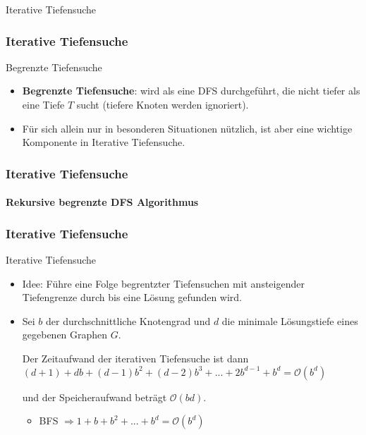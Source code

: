 \begin{frame}
		\Huge Iterative Tiefensuche
\end{frame}
	
\begin{frame}
	\frametitle{Iterative Tiefensuche}
	\begin{KITinfoblock}{Begrenzte Tiefensuche}
	\begin{itemize}
		\item \textbf{Begrenzte Tiefensuche}: wird als eine DFS durchgeführt, die nicht tiefer als eine Tiefe $T$ sucht (tiefere Knoten werden ignoriert).
		\item Für sich allein nur in besonderen Situationen nützlich, ist aber eine wichtige Komponente in Iterative Tiefensuche.
	\end{itemize}
	\end{KITinfoblock}
\end{frame}

\begin{frame}
	\frametitle{Iterative Tiefensuche}
	\framesubtitle{Rekursive begrenzte DFS Algorithmus}
		
\end{frame}

\begin{frame}
	\frametitle{Iterative Tiefensuche}
	\begin{KITinfoblock}{Iterative Tiefensuche}
		\begin{itemize}
			\item Idee: Führe eine Folge begrentzter Tiefensuchen mit ansteigender Tiefengrenze durch bis eine Lösung gefunden wird.
			
			\item Sei $b$ der durchschnittliche Knotengrad und $d$ die minimale Lösungstiefe eines gegebenen Graphen $G$.
			  
			\vspace{0.05in}
			Der Zeitaufwand der iterativen Tiefensuche ist dann
			\linebreak[2]
			$(d+1) + db + (d-1)b^2 + (d-2)b^3 + ... + 2b^{d-1} + b^d = \mathcal{O}(b^d)$
			
			und der Speicheraufwand beträgt $\mathcal{O}(bd)$.
			\begin{itemize}
				\item BFS $\Rightarrow 1 + b + b^2 + ... + b^d = \mathcal{O}(b^d)$
			\end{itemize}			
		\end{itemize}
	\end{KITinfoblock}
	\pause
	
	
\end{frame}

